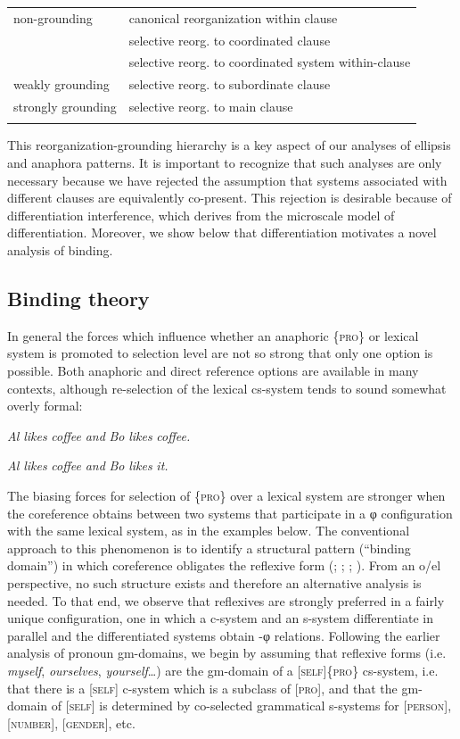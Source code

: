 \begin{tabularx}{\textwidth}{XX}
\lsptoprule
non-grounding & canonical reorganization within clause\\
& selective reorg. to coordinated clause\\
& selective reorg. to coordinated system within-clause\\
weakly grounding & selective reorg. to subordinate clause\\
strongly grounding & selective reorg. to main clause\\
\lspbottomrule
\end{tabularx}
  This reorganization-grounding hierarchy is a key aspect of our analyses of ellipsis and anaphora patterns. It is important to recognize that such analyses are only necessary because we have rejected the assumption that systems associated with different clauses are equivalently co-present. This rejection is desirable because of differentiation interference, which derives from the microscale model of differentiation. Moreover, we show below that differentiation motivates a novel analysis of binding.

\subsection{Binding theory}

In general the forces which influence whether an anaphoric \{\textsc{pro}\} or lexical system is promoted to selection level are not so strong that only one option is possible. Both anaphoric and direct reference options are available in many contexts, although re-selection of the lexical cs-system tends to sound somewhat overly formal:

    \textit{Al} \textit{likes} \textit{coffee} \textit{and} \textit{Bo} \textit{likes} \textit{coffee.}

    \textit{Al} \textit{likes} \textit{coffee} \textit{and} \textit{Bo} \textit{likes} \textit{it.}

  The biasing forces for selection of \{\textsc{pro}\} over a lexical system are stronger when the coreference obtains between two systems that participate in a φ configuration with the same lexical system, as in the examples below. The conventional approach to this phenomenon is to identify a structural pattern (“binding domain”) in which coreference obligates the reflexive form (\citealt{Chomsky19821993}; \citealt{Haegeman1994}; \citealt{Reinhart1976}; \citealt{Safir2004}). From an o/el perspective, no such structure exists and therefore an alternative analysis is needed. To that end, we observe that reflexives are strongly preferred in a fairly unique configuration, one in which a c-system and an s-system differentiate in parallel and the differentiated systems obtain -φ relations. Following the earlier analysis of pronoun gm-domains, we begin by assuming that reflexive forms (i.e. \textit{myself}, \textit{ourselves}, \textit{yourself}…) are the gm-domain of a [\textsc{self}]\{\textsc{pro}\} cs-system, i.e. that there is a [\textsc{self}] c-system which is a subclass of [\textsc{pro}], and that the gm-domain of [\textsc{self}] is determined by co-selected grammatical s-systems for [\textsc{person}], [\textsc{number}], [\textsc{gender}], etc. 

